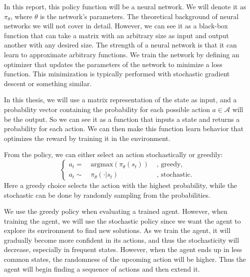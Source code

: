 \documentclass[12pt,A4]{report}
\theoremstyle{definition}
\begin{document}
In this report, this policy function will be a neural network. We will denote it as $\pi_\theta$, where $\theta$ is the network's parameters. The theoretical background of neural networks we will not cover in detail. However, we can see it as a black-box function that can take a matrix with an arbitrary size as input and output another with any desired size. The strength of a neural network is that it can learn to approximate arbitrary functions. We train the network by defining an optimizer that updates the parameters of the network to minimize a loss function. This minimization is typically performed with stochastic gradient descent or something similar.  

In this thesis, we will use a matrix representation of the state as input, and a probability vector containing the probability for each possible action $a \in \mathcal{A}$ will be the output. So we can see it as a function that inputs a state and returns a probability for each action. We can then make this function learn behavior that optimizes the reward by training it in the environment.

From the policy, we can either select an action stochastically or greedily:
\begin{equation*}
  \left\{ 
  \begin{aligned}
    a_t =& \ \text{argmax}(\pi_\theta(s_t))& \text{ , greedy,} \\
    a_t \sim& \ \pi_\theta(\cdot | s_t)& \text{ , stochastic}.
  \end{aligned}
  \right.
\end{equation*}
Here a greedy choice selects the action with the highest probability, while the stochastic can be done by randomly sampling from the probabilities. 

We use the greedy policy when evaluating a trained agent. However,  when training the agent, we will use the stochastic policy since we want the agent to explore its environment to find new solutions. As we train the agent, it will gradually become more confident in its actions, and thus the stochasticity will decrease, especially in frequent states. However, when the agent ends up in less common states, the randomness of the upcoming action will be higher. Thus the agent will begin finding a sequence of actions and then extend it.
\end{document}
